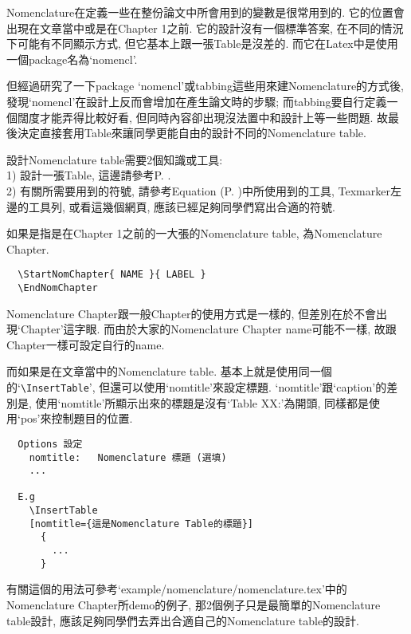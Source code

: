 
Nomenclature在定義一些在整份論文中所會用到的變數是很常用到的. 它的位置會出現在文章當中或是在Chapter 1之前. 它的設計沒有一個標準答案, 在不同的情況下可能有不同顯示方式, 但它基本上跟一張Table是沒差的. 而它在Latex中是使用一個package名為`nomencl'.

但經過研究了一下package `nomencl'或tabbing這些用來建Nomenclature的方式後, 發現`nomencl'在設計上反而會增加在產生論文時的步驟; 而tabbing要自行定義一個闊度才能弄得比較好看, 但同時內容卻出現沒法置中和設計上等一些問題. 故最後決定直接套用Table來讓同學更能自由的設計不同的Nomenclature table.

設計Nomenclature table需要2個知識或工具:\\
1) 設計一張Table, 這邊請參考P. .\\
2) 有關所需要用到的符號, 請參考Equation (P. )中所使用到的工具, Texmarker左邊的工具列, 或看這幾個網頁, 應該已經足夠同學們寫出合適的符號.

{}

如果是指是在Chapter 1之前的一大張的Nomenclature table, 為Nomenclature Chapter.
  \begin{verbatim}
  \StartNomChapter{ NAME }{ LABEL }
  \EndNomChapter
  \end{verbatim}
Nomenclature Chapter跟一般Chapter的使用方式是一樣的, 但差別在於不會出現`Chapter'這字眼. 而由於大家的Nomenclature Chapter name可能不一樣, 故跟Chapter一樣可設定自行的name.

而如果是在文章當中的Nomenclature table. 基本上就是使用同一個的`\verb|\InsertTable|', 但還可以使用`nomtitle'來設定標題. `nomtitle'跟`caption'的差別是, 使用`nomtitle'所顯示出來的標題是沒有`Table XX:'為開頭, 同樣都是使用`pos'來控制題目的位置.

  \begin{DescriptionFrame}
  \begin{verbatim}
  Options 設定
    nomtitle:   Nomenclature 標題 (選填)
    ...

  E.g
    \InsertTable
    [nomtitle={這是Nomenclature Table的標題}]
      {
        ...
      }
  \end{verbatim}
  \end{DescriptionFrame}

有關這個的用法可參考`example/nomenclature/nomenclature.tex'中的Nomenclature Chapter所demo的例子, 那2個例子只是最簡單的Nomenclature table設計, 應該足夠同學們去弄出合適自己的Nomenclature table的設計.
